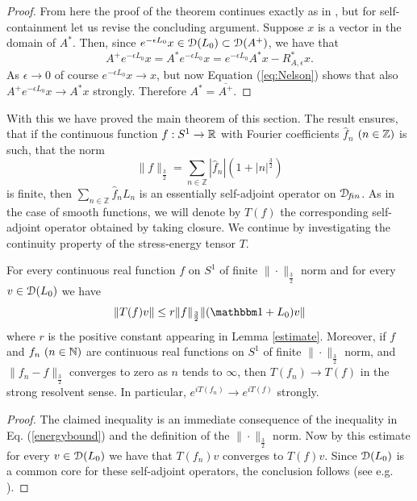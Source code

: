\documentclass[12pt]{article}
\begin{document}
\begin{proof}
From here the proof of the theorem continues exactly 
as in \cite{Ne}, but for self-containment let us revise 
the concluding argument. Suppose $x$ is a vector in the
domain of $A^*$. Then, since $e^{-\epsilon L_0}x \in {\mathcal D}(L_0) \subset 
{\mathcal D} (A^+)$,
we have that 
\begin{equation}
\label{eq:Nelson}
A^+ e^{-\epsilon L_0} x = A^* e^{-\epsilon L_0}x =
e^{-\epsilon L_0} A^* x  - R^*_{A,\epsilon}x.
\end{equation} 
As $\epsilon \rightarrow 0$ of course 
$e^{-\epsilon L_0}x \rightarrow x$, but now
Equation (\ref{eq:Nelson}) shows that also
$A^+ e^{-\epsilon L_0} x \rightarrow A^*x$
strongly. Therefore $A^*=\overline{A^+}$.
\end{proof}

With this we have proved the main theorem of this section. The
result ensures, that if the continuous function 
$f: S^1 \rightarrow {\mathbb R}$ with Fourier coefficients
$\hat{f}_n$ $(n \in {\mathbb Z})$ is such, that the norm 
\begin{equation} 
\|f\|_{\frac{3}{2}}=
\mathop{\sum}_{n \in {\mathbb Z}}|\hat{f}_n|(1+|n|^{\frac{3}{2}})
\end{equation}
is finite, 
then $\mathop{\sum}_{n \in {\mathbb Z}} \hat{f}_n L_n$ is an essentially
self-adjoint operator on ${\mathcal D}\!_{f\!in}$. As in the case of smooth functions,
we will denote by $T(f)$ the corresponding self-adjoint operator 
obtained by taking closure. We continue by investigating the
continuity property of the stress-energy tensor $T$.
\begin{proposition}
\label{convergence} 
For every continuous real function $f$ on $S^1$ of finite
$\|\cdot\|_{\frac{3}{2}}$ norm and for every $v \in {\mathcal D}(L_0)$
we have
\begin{equation}
\|T(f)v\| \leq r \|f\|_{\frac{3}{2}} \|(\mathbbm 1+L_0)v\|
\end{equation}
where $r$ is the positive constant appearing in 
Lemma \ref{estimate}. Moreover, if $f$ and $f_n \,\, (n\in {\mathbb N})$ 
are continuous real functions on $S^1$ of finite
$\|\cdot\|_{\frac{3}{2}}$ norm, and $\|f_n-f\|_{\frac{3}{2}}$ 
converges to zero as $n$ tends to $\infty$, then $T(f_n) 
\rightarrow T(f)$ in the strong resolvent sense. In
particular, $e^{iT(f_n)} \rightarrow e^{iT(f)}$ strongly.
\end{proposition}
\begin{proof}
The claimed inequality is an immediate consequence of 
the inequality in Eq. (\ref{energybound}) and the
definition of the $\|\cdot\|_{\frac{3}{2}}$ norm.
Now by this estimate for every $v \in {\mathcal D}(L_0)$ we have
that $T(f_n)v$ converges to $T(f)v$. Since ${\mathcal D}(L_0)$
is a common core for these self-adjoint operators,
the conclusion follows (see e.g. \cite[Sect. VIII.7]{RSI}).
\end{proof}
\end{document}
